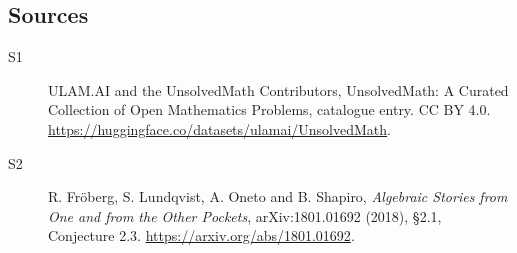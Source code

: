 \documentclass[11pt]{article}
\begin{document}
\subsection{Sources}
\begin{description}
\item[\hypertarget{source:statement:1}{S1}] ULAM.AI and the UnsolvedMath Contributors, UnsolvedMath: A Curated Collection of Open Mathematics Problems, catalogue entry. CC BY 4.0. \url{https://huggingface.co/datasets/ulamai/UnsolvedMath}.
\item[\hypertarget{source:statement:2}{S2}] R. Fröberg, S. Lundqvist, A. Oneto and B. Shapiro, \emph{Algebraic Stories from One and from the Other Pockets}, arXiv:1801.01692 (2018), §2.1, Conjecture 2.3. \url{https://arxiv.org/abs/1801.01692}.
\end{description}
\label{end:statement}
\end{document}
